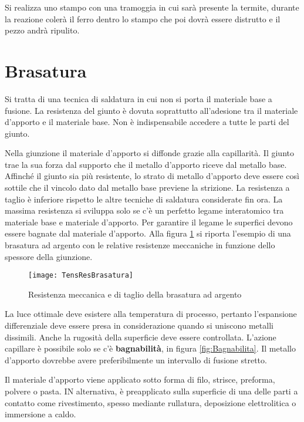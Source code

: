 Si realizza uno stampo con una tramoggia in cui sarà presente la termite, durante la reazione colerà il ferro dentro lo stampo che poi dovrà essere distrutto e il pezzo andrà ripulito.

\section{Brasatura}
Si tratta di una tecnica di saldatura in cui non si porta il materiale base a fusione. La resistenza del giunto è dovuta soprattutto all'adesione tra il materiale d'apporto e il materiale base.
Non è indispensabile accedere a tutte le parti del giunto.

Nella giunzione il materiale d'apporto si diffonde grazie alla capillarità.
Il giunto trae la sua forza dal supporto che il metallo d'apporto riceve dal metallo base.
Affinché il giunto sia più resistente, lo strato di metallo d'apporto deve essere così sottile che il vincolo dato dal metallo base previene la strizione.
La resistenza a taglio è inferiore rispetto le altre tecniche di saldatura considerate fin ora.
La massima resistenza si sviluppa solo se c'è un perfetto legame interatomico tra materiale base e materiale d'apporto.
Per garantire il legame le superfici devono essere bagnate dal materiale d'apporto.
Alla figura \ref{fig:TensResBrasatura} si riporta l'esempio di una brasatura ad argento con le relative resistenze meccaniche in funzione dello spessore della giunzione.

\begin{figure}
\centering
\texttt{[image: TensResBrasatura]}
\caption{Resistenza meccanica e di taglio della brasatura ad argento}
\label{fig:TensResBrasatura}
\end{figure}

La luce ottimale deve esistere alla temperatura di processo, pertanto l'espansione differenziale deve essere presa in considerazione quando si uniscono metalli dissimili.
Anche la rugosità della superficie deve essere controllata.
L'azione capillare è possibile solo se c'è \textbf{bagnabilità}, in figura \ref{fig:Bagnabilita}.
Il metallo d'apporto dovrebbe avere preferibilmente un intervallo di fusione stretto.

Il materiale d'apporto viene applicato sotto forma di filo, strisce, preforma, polvere o pasta.
IN alternativa, è preapplicato sulla superficie di una delle parti a contatto come rivestimento, spesso mediante rullatura, deposizione elettrolitica o immersione a caldo.

